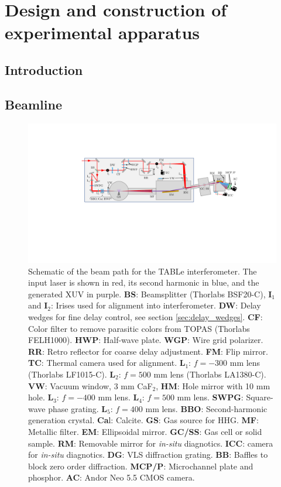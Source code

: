 \chapter{Design and construction of experimental apparatus}
\label{beamline}

\section{Introduction}
\label{intro_beamline}


\section{Beamline}
\label{sec:full_beamline}


\begin{figure}
	\centering
	\includegraphics[width=1.0\textwidth]{figures/Beamline/beampath_sketch_3.pdf}
	\caption{Schematic of the beam path for the TABLe interferometer. The input laser is shown in red, its second harmonic in  blue, and the generated XUV in purple.  \textbf{BS}: Beamsplitter (Thorlabs BSF20-C), \textbf{I$_1$} and \textbf{I$_2$}: Irises used for alignment into interferometer. \textbf{DW}: Delay wedges for fine delay control, see section \ref{sec:delay_wedges}. \textbf{CF}: Color filter to remove parasitic colors from TOPAS (Thorlabs FELH1000). \textbf{HWP}: Half-wave plate. \textbf{WGP}: Wire grid polarizer. \textbf{RR}: Retro reflector for coarse delay adjustment.  \textbf{FM}: Flip mirror. \textbf{TC}: Thermal camera used for alignment.  \textbf{L$_1$}: $f=-300$ mm lens (Thorlabs LF1015-C). \textbf{L$_2$}: $f=500$ mm lens (Thorlabs LA1380-C). \textbf{VW}: Vacuum window, 3 mm CaF$_2$, \textbf{HM}: Hole mirror with 10 mm hole.  \textbf{L$_3$}: $f=-400$ mm lens.  \textbf{L$_4$}: $f=500$ mm lens. \textbf{SWPG}: Square-wave phase grating. \textbf{L$_5$}: $f=400$ mm lens.  \textbf{BBO}: Second-harmonic generation crystal.  \textbf{Ca}l: Calcite. \textbf{GS}: Gas source for HHG. \textbf{MF}: Metallic filter. \textbf{EM}: Ellipsoidal mirror. \textbf{GC/SS}: Gas cell or solid sample. \textbf{RM}: Removable mirror for \textit{in-situ} diagnotics.    \textbf{ICC}: camera for \textit{in-situ} diagnotics. \textbf{DG}: VLS diffraction grating. \textbf{BB}: Baffles to block zero order diffraction.  \textbf{MCP/P}: Microchannel plate and phosphor.  \textbf{AC}: Andor Neo 5.5 CMOS camera.}
	\label{fig:beampath_sketch}
\end{figure}


